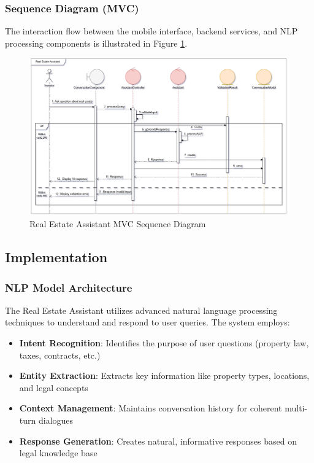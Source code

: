 \subsubsection{Sequence Diagram (MVC)}
The interaction flow between the mobile interface, backend services, and NLP processing components is illustrated in Figure \ref{fig:assistant-sequence-mvc}.
\newpage
\begin{figure}[htbp]
    \centering
    \includegraphics[width=1\textwidth]{images/assistant_sequence_mvc.png}
    \caption{Real Estate Assistant MVC Sequence Diagram}
    \label{fig:assistant-sequence-mvc}
\end{figure}

\subsection{Implementation}
\subsubsection{NLP Model Architecture}
The Real Estate Assistant utilizes advanced natural language processing techniques to understand and respond to user queries. The system employs:

\begin{itemize}
    \item \textbf{Intent Recognition}: Identifies the purpose of user questions (property law, taxes, contracts, etc.)
    \item \textbf{Entity Extraction}: Extracts key information like property types, locations, and legal concepts
    \item \textbf{Context Management}: Maintains conversation history for coherent multi-turn dialogues
    \item \textbf{Response Generation}: Creates natural, informative responses based on legal knowledge base
\end{itemize}

